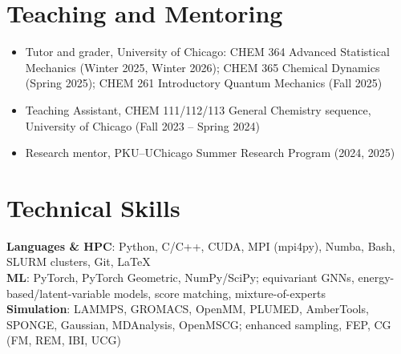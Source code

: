 \documentclass[letterpaper,10.5pt]{article}
\newcommand{\resumeItem}[1]{\item\small{#1\vspace{-1pt}}}
\begin{document}
\section{Teaching and Mentoring}
  \begin{itemize}[leftmargin=0.18in, itemsep=0pt]
    \resumeItem{Tutor and grader, University of Chicago: CHEM 364 Advanced Statistical Mechanics (Winter 2025, Winter 2026); CHEM 365 Chemical Dynamics (Spring 2025); CHEM 261 Introductory Quantum Mechanics (Fall 2025)}
    \resumeItem{Teaching Assistant, CHEM 111/112/113 General Chemistry sequence, University of Chicago (Fall 2023 -- Spring 2024)}
    \resumeItem{Research mentor, PKU--UChicago Summer Research Program (2024, 2025)}
  \end{itemize}

\section{Technical Skills}
 \begin{itemize}[leftmargin=0.0in, label={}]
    \small{\item{
     \textbf{Languages \& HPC}{: Python, C/C++, CUDA, MPI (mpi4py), Numba, Bash, SLURM clusters, Git, \LaTeX} \\
     \textbf{ML}{: PyTorch, PyTorch Geometric, NumPy/SciPy; equivariant GNNs, energy-based/latent-variable models, score matching, mixture-of-experts} \\
     \textbf{Simulation}{: LAMMPS, GROMACS, OpenMM, PLUMED, AmberTools, SPONGE, Gaussian, MDAnalysis, OpenMSCG; enhanced sampling, FEP, CG (FM, REM, IBI, UCG)}
    }}
 \end{itemize}
\end{document}
